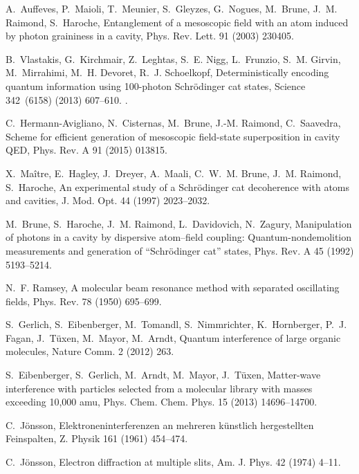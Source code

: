\documentclass[3p,sort&compress,12pt]{elsarticle}
\begin{document}
\begin{thebibliography}{100}
A.~Auffeves, P.~Maioli, T.~Meunier, S.~Gleyzes, G.~Nogues, M.~Brune, J.~M.
  Raimond, S.~Haroche, Entanglement of a mesoscopic field with an atom induced
  by photon graininess in a cavity, Phys. Rev. Lett. 91 (2003) 230405.

B.~Vlastakis, G.~Kirchmair, Z.~Leghtas, S.~E. Nigg, L.~Frunzio, S.~M. Girvin,
  M.~Mirrahimi, M.~H. Devoret, R.~J. Schoelkopf, Deterministically encoding
  quantum information using 100-photon {S}chr{\"o}dinger cat states, Science
  342~(6158) (2013) 607--610.
\newblock \href {http://dx.doi.org/10.1126/science.1243289}
  {}.

C.~Hermann-Avigliano, N.~Cisternas, M.~Brune, J.-M. Raimond, C.~Saavedra,
  Scheme for efficient generation of mesoscopic field-state superposition in
  cavity {QED}, Phys. Rev. A 91 (2015) 013815.

X.~Ma{\^i}tre, E.~Hagley, J.~Dreyer, A.~Maali, C.~W.~M. Brune, J.~M. Raimond,
  S.~Haroche, An experimental study of a {S}chr{\"o}dinger cat decoherence with
  atoms and cavities, J. Mod. Opt. 44 (1997) 2023--2032.

M.~Brune, S.~Haroche, J.~M. Raimond, L.~Davidovich, N.~Zagury, Manipulation of
  photons in a cavity by dispersive atom--field coupling: Quantum-nondemolition
  measurements and generation of {``}{S}chr{\"o}dinger cat{''} states, Phys.
  Rev. A 45 (1992) 5193--5214.

N.~F. Ramsey, A molecular beam resonance method with separated oscillating
  fields, Phys. Rev. 78 (1950) 695--699.

S.~Gerlich, S.~Eibenberger, M.~Tomandl, S.~Nimmrichter, K.~Hornberger, P.~J.
  Fagan, J.~T{\"u}xen, M.~Mayor, M.~Arndt, Quantum interference of large
  organic molecules, Nature Comm. 2 (2012) 263.

S.~Eibenberger, S.~Gerlich, M.~Arndt, M.~Mayor, J.~T{\"u}xen, Matter-wave
  interference with particles selected from a molecular library with masses
  exceeding 10,000 amu, Phys. Chem. Chem. Phys. 15 (2013) 14696--14700.

C.~J{\"o}nsson, Elektroneninterferenzen an mehreren k{\"u}nstlich hergestellten
  {F}einspalten, Z. Physik 161 (1961) 454--474.

C.~J{\"o}nsson, Electron diffraction at multiple slits, Am. J. Phys. 42 (1974)
  4--11.


\end{thebibliography}
\end{document}
